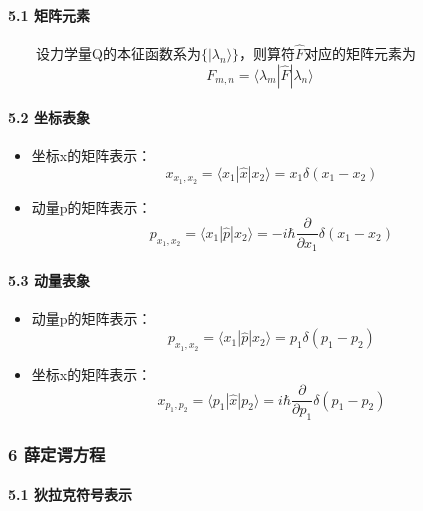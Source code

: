 \documentclass[UTF8,twocolumn]{ctexart}
\providecommand{\tightlist}{%
  \setlength{\itemsep}{0pt}\setlength{\parskip}{0pt}}
\let\oldparagraph\paragraph
\renewcommand{\paragraph}[1]{\oldparagraph{#1}\mbox{}}
\begin{document}
\hypertarget{ux77e9ux9635ux5143ux7d20-1}{%
\paragraph{ 5.1 矩阵元素}\label{ux77e9ux9635ux5143ux7d20-1}}

  设力学量Q的本征函数系为\(\{|\lambda_n\rangle\}\)，则算符\(\hat{F}\)对应的矩阵元素为
\[F_{m,n}=\langle\lambda_m|\hat{F}|\lambda_n\rangle\]

\hypertarget{ux5750ux6807ux8868ux8c61}{%
\paragraph{ 5.2 坐标表象}\label{ux5750ux6807ux8868ux8c61}}

\begin{itemize}
\tightlist
\item
  坐标x的矩阵表示：
  \[x_{x_1,x_2}=\langle x_1|\hat{x}|x_2\rangle=x_1\delta(x_1-x_2)\]
\item
  动量p的矩阵表示：
  \[p_{x_1,x_2}=\langle x_1|\hat{p}|x_2\rangle=-i\hbar\frac{\partial}{\partial x_1}\delta(x_1-x_2)\]
\end{itemize}

\hypertarget{ux52a8ux91cfux8868ux8c61}{%
\paragraph{ 5.3 动量表象}\label{ux52a8ux91cfux8868ux8c61}}

\begin{itemize}
\tightlist
\item
  动量p的矩阵表示：
  \[p_{x_1,x_2}=\langle x_1|\hat{p}|x_2\rangle=p_1\delta(p_1-p_2)\]
\item
  坐标x的矩阵表示：
  \[x_{p_1,p_2}=\langle p_1|\hat{x}|p_2\rangle=i\hbar\frac{\partial}{\partial p_1}\delta(p_1-p_2)\]
\end{itemize}

\hypertarget{ux859bux5b9aux8c14ux65b9ux7a0b-1}{%
\subsubsection{6 薛定谔方程}\label{ux859bux5b9aux8c14ux65b9ux7a0b-1}}

\hypertarget{ux72c4ux62c9ux514bux7b26ux53f7ux8868ux793a}{%
\paragraph{ 5.1
狄拉克符号表示}\label{ux72c4ux62c9ux514bux7b26ux53f7ux8868ux793a}}
\end{document}
